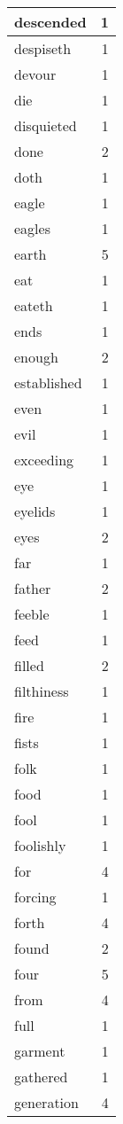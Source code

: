 \begin{center}
\begin{longtable}{l|r}
descended & 1\\ \hline 
despiseth & 1\\ \hline 
devour & 1\\ \hline 
die & 1\\ \hline 
disquieted & 1\\ \hline 
done & 2\\ \hline 
doth & 1\\ \hline 
eagle & 1\\ \hline 
eagles & 1\\ \hline 
earth & 5\\ \hline 
eat & 1\\ \hline 
eateth & 1\\ \hline 
ends & 1\\ \hline 
enough & 2\\ \hline 
established & 1\\ \hline 
even & 1\\ \hline 
evil & 1\\ \hline 
exceeding & 1\\ \hline 
eye & 1\\ \hline 
eyelids & 1\\ \hline 
eyes & 2\\ \hline 
far & 1\\ \hline 
father & 2\\ \hline 
feeble & 1\\ \hline 
feed & 1\\ \hline 
filled & 2\\ \hline 
filthiness & 1\\ \hline 
fire & 1\\ \hline 
fists & 1\\ \hline 
folk & 1\\ \hline 
food & 1\\ \hline 
fool & 1\\ \hline 
foolishly & 1\\ \hline 
for & 4\\ \hline 
forcing & 1\\ \hline 
forth & 4\\ \hline 
found & 2\\ \hline 
four & 5\\ \hline 
from & 4\\ \hline 
full & 1\\ \hline 
garment & 1\\ \hline 
gathered & 1\\ \hline 
generation & 4\\ \hline 

\end{longtable}
\end{center}
